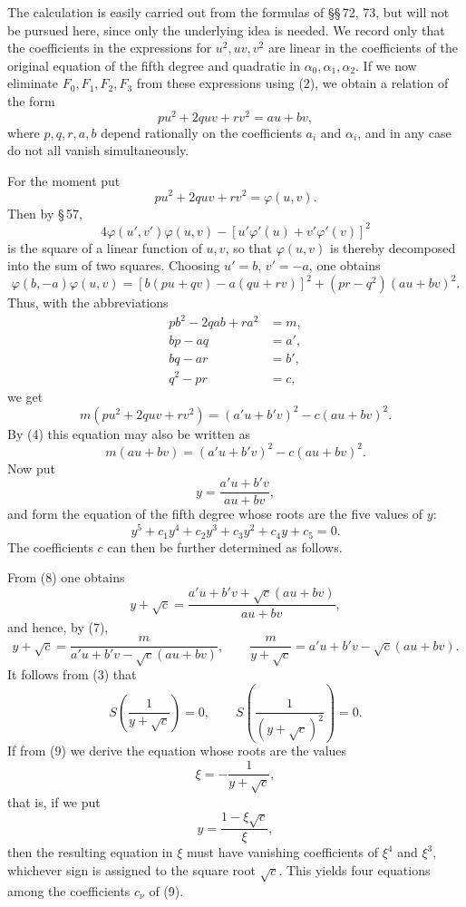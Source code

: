 \documentclass[11pt]{article}
\begin{document}
The calculation is easily carried out from the formulas of \S\S\,72, 73, but will not be pursued here, since only the underlying idea is needed. We record only that the coefficients in the expressions for $u^2,uv,v^2$ are linear in the coefficients of the original equation of the fifth degree and quadratic in $\alpha_0,\alpha_1,\alpha_2$. If we now eliminate $F_0,F_1,F_2,F_3$ from these expressions using (2), we obtain a relation of the form
\begin{equation}
 pu^2+2quv+rv^2=au+bv,
\tag{4}
\end{equation}
where $p,q,r,a,b$ depend rationally on the coefficients $a_i$ and $\alpha_i$, and in any case do not all vanish simultaneously.

For the moment put
\[
 pu^2+2quv+rv^2=\varphi(u,v).
\]
Then by \S\,57,
\[
 4\varphi(u',v')\varphi(u,v)-[u'\varphi'(u)+v'\varphi'(v)]^2
\]
is the square of a linear function of $u,v$, so that $\varphi(u,v)$ is thereby decomposed into the sum of two squares. Choosing $u'=b$, $v'=-a$, one obtains
\[
 \varphi(b,-a)\varphi(u,v)=[b(pu+qv)-a(qu+rv)]^2+(pr-q^2)(au+bv)^2.
\]
Thus, with the abbreviations
\begin{equation}
\begin{aligned}
pb^2-2qab+ra^2&=m,\\
bp-aq&=a',\\
bq-ar&=b',\\
q^2-pr&=c,
\end{aligned}
\tag{5}
\end{equation}
we get
\begin{equation}
 m(pu^2+2quv+rv^2)=(a'u+b'v)^2-c(au+bv)^2.
\tag{6}
\end{equation}
By (4) this equation may also be written as
\begin{equation}
 m(au+bv)=(a'u+b'v)^2-c(au+bv)^2.
\tag{7}
\end{equation}
Now put
\begin{equation}
 y=\frac{a'u+b'v}{au+bv},
\tag{8}
\end{equation}
and form the equation of the fifth degree whose roots are the five values of $y$:
\begin{equation}
 y^5+c_1y^4+c_2y^3+c_3y^2+c_4y+c_5=0.
\tag{9}
\end{equation}
The coefficients $c$ can then be further determined as follows.

From (8) one obtains
\[
 y+\sqrt c=\frac{a'u+b'v+\sqrt c(au+bv)}{au+bv},
\]
and hence, by (7),
\[
 y+\sqrt c=\frac{m}{a'u+b'v-\sqrt c(au+bv)},
\qquad
\frac{m}{y+\sqrt c}=a'u+b'v-\sqrt c(au+bv).
\]
It follows from (3) that
\[
 S\left(\frac1{y+\sqrt c}\right)=0,
 \qquad
 S\left(\frac1{(y+\sqrt c)^2}\right)=0.
\]
If from (9) we derive the equation whose roots are the values
\[
 \xi=-\frac1{y+\sqrt c},
\]
that is, if we put
\[
 y=\frac{1-\xi\sqrt c}{\xi},
\]
then the resulting equation in $\xi$ must have vanishing coefficients of $\xi^4$ and $\xi^3$, whichever sign is assigned to the square root $\sqrt c$. This yields four equations among the coefficients $c_\nu$ of (9).
\end{document}
